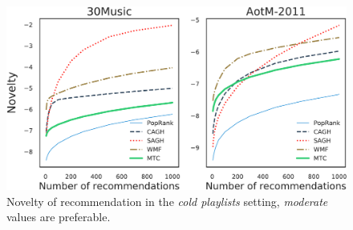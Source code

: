 

\begin{figure}[!t]
    \centering
    \includegraphics[width=\columnwidth]{fig/nov3.pdf}
    \caption{Novelty of recommendation in the \emph{cold playlists} setting,
\emph{moderate} values are preferable.}
\end{figure}

